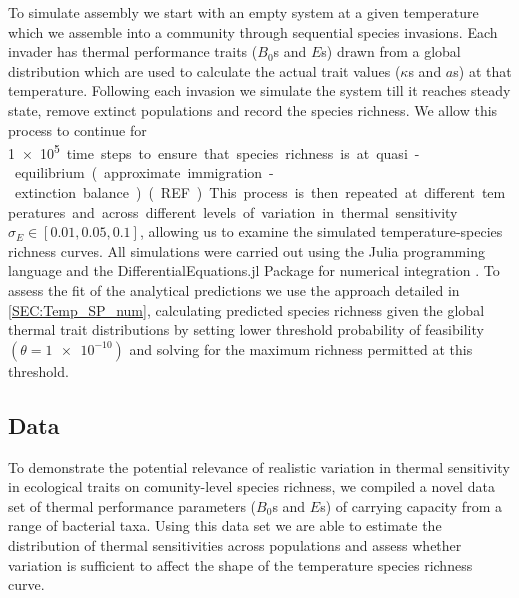 \documentclass{article}
\begin{document}
To simulate assembly we start with an empty system at a given temperature which we assemble into a community through sequential species invasions. Each invader has thermal performance traits ($B_0$s and $E$s) drawn from a global distribution which are used to calculate the actual trait values ($\kappa$s and $a$s) at that temperature. Following each invasion we simulate the system till it reaches steady state, remove extinct populations and record the species richness. We allow this process to continue for \SI{1e5} time steps to ensure that species richness is at quasi-equilibrium (approximate immigration-extinction balance) (REF). This process is then repeated at different temperatures and across different levels of variation in thermal sensitivity $\sigma_E \in [0.01, 0.05, 0.1]$, allowing us to examine the simulated temperature-species richness curves. All simulations were carried out using the Julia programming language and the DifferentialEquations.jl Package for numerical integration \citep{Rackauckas2017}. To assess the fit of the analytical predictions we use the approach detailed in \cref{SEC:Temp_SP_num}, calculating predicted species richness given the global thermal trait distributions by setting lower threshold probability of feasibility $(\theta = \SI{1e-10})$ and solving for the maximum richness permitted at this threshold.

\subsection*{Data}

To demonstrate the potential relevance of realistic  variation in thermal sensitivity in ecological traits on comunity-level species richness, we compiled a novel data set of thermal performance parameters ($B_0$s and $E$s) of carrying capacity from a range of bacterial taxa. Using this data set we are able to estimate the distribution of thermal sensitivities across populations and assess whether variation is sufficient to affect the shape of the temperature species richness curve. 
\end{document}
